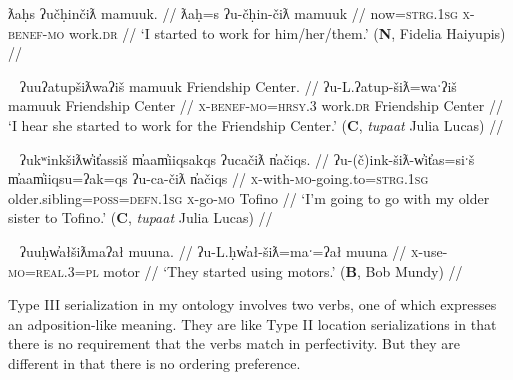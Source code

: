 \ex \label{ex:starttoworkfor}
\begingl
\glpreamble ƛaḥs ʔučḥinčiƛ mamuuk. //
\gla ƛaḥ=s ʔu-čḥin-čiƛ mamuuk //
\glb now=\textsc{strg.1sg} \textsc{x}-\textsc{benef}-\textsc{mo} work.\textsc{dr} //
\glft `I started to work for him/her/them.' (\textbf{N}, Fidelia Haiyupis) //
\endgl
\xe

\ex~ \label{ex:starttoworkfor2}
\begingl
\glpreamble ʔuuʔatupšiƛwaʔiš mamuuk Friendship Center. //
\gla ʔu-L.ʔatup-šiƛ=waˑʔiš mamuuk Friendship Center //
\glb \textsc{x}-\textsc{benef}-\textsc{mo}=\textsc{hrsy.3} work.\textsc{dr} Friendship Center //
\glft `I hear she started to work for the Friendship Center.' (\textbf{C}, \textit{tupaat} Julia Lucas) //
\endgl
\xe

\ex~ \label{ex:starttobewith}
\begingl
\glpreamble ʔukʷinkšiƛw̓it̓assiš m̓aam̓iiqsakqs ʔucačiƛ n̓ačiqs. //
\gla ʔu-(č)ink-šiƛ-w̓it̓as=siˑš m̓aam̓iiqsu=ʔak=qs ʔu-ca-čiƛ n̓ačiqs //
\glb \textsc{x}-with-\textsc{mo}-going.to=\textsc{strg.1sg} older.sibling=\textsc{poss}=\textsc{defn.1sg} \textsc{x}-go-\textsc{mo} Tofino //
\glft `I'm going to go with my older sister to Tofino.' (\textbf{C}, \textit{tupaat} Julia Lucas) //
\endgl
\xe

\ex~ \label{ex:starttouse}
\begingl
\glpreamble ʔuuḥw̓ałšiƛmaʔał muuna. //
\gla ʔu-L.ḥw̓ał-šiƛ=maˑ=ʔał muuna //
\glb \textsc{x}-use-\textsc{mo}=\textsc{real.3}=\textsc{pl} motor //
\glft `They started using motors.' (\textbf{B}, Bob Mundy) //
\endgl
\xe

Type III serialization in my ontology involves two verbs, one of which expresses an adposition-like meaning. They are like Type II location serializations in that there is no requirement that the verbs match in perfectivity. But they are different in that there is no ordering preference.

\vspace{10pt}

\begin{comment}
\subsubsection{IV. Transitive-Intransitive Repetition}

\vspace{10pt}

Nuuchahnulth has a series of words with similar or identical meanings that differ only or mostly in transitivity. These include transitive and intransitive eat (\textit{-!iis} and \textit{haʔuk}, as in \ref{ex:eateat}) and cry and cry for (\textit{ʕiḥak} and \textit{ʔuʔuuy̓uk}, as in \ref{ex:crycry}). Speakers frequently will use both versions in a sentence.

While \textit{waa} `say' can be used as a transitive quotative, it can be used intransitively as well, similar to English \textit{speak}. It can enter into this kind of SVC in this capacity, doubling with another verb of speaking (\ref{ex:sayabout}). This characteristic doubling can also occur with \textit{ʔiiqḥuk} `tell' (\ref{ex:talkabout}).

\end{comment}

